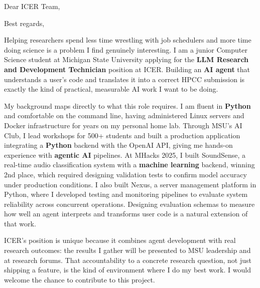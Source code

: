 \documentclass[11pt,letterpaper,sans]{moderncv}
\begin{document}
\date{\today}
\opening{Dear ICER Team,}
\closing{Best regards,}
\makelettertitle

Helping researchers spend less time wrestling with job schedulers and more time doing science is a problem I find genuinely interesting. I am a junior Computer Science student at Michigan State University applying for the \textbf{LLM Research and Development Technician} position at ICER. Building an \textbf{AI agent} that understands a user's code and translates it into a correct HPCC submission is exactly the kind of practical, measurable AI work I want to be doing.

My background maps directly to what this role requires. I am fluent in \textbf{Python} and comfortable on the command line, having administered Linux servers and Docker infrastructure for years on my personal home lab. Through MSU's AI Club, I lead workshops for 500+ students and built a production application integrating a \textbf{Python} backend with the OpenAI API, giving me hands-on experience with \textbf{agentic AI} pipelines. At MHacks 2025, I built SoundSense, a real-time audio classification system with a \textbf{machine learning} backend, winning 2nd place, which required designing validation tests to confirm model accuracy under production conditions. I also built Nexus, a server management platform in Python, where I developed testing and monitoring pipelines to evaluate system reliability across concurrent operations. Designing evaluation schemas to measure how well an agent interprets and transforms user code is a natural extension of that work.

ICER's position is unique because it combines agent development with real research outcomes: the results I gather will be presented to MSU leadership and at research forums. That accountability to a concrete research question, not just shipping a feature, is the kind of environment where I do my best work. I would welcome the chance to contribute to this project.

\makeletterclosing
\end{document}

